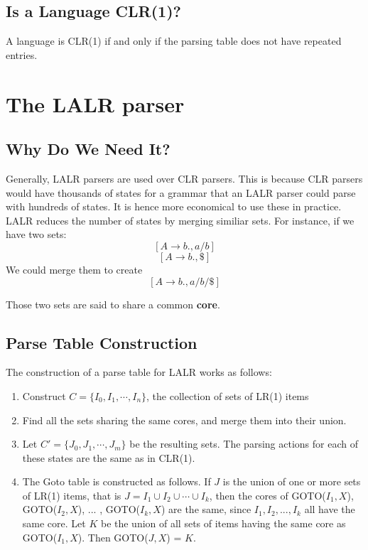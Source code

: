 \documentclass[12pt,letterpaper]{book}
\theoremstyle{definition}
\begin{document}
\subsection{Is a Language CLR(1)?}

A language is CLR(1) if and only if the parsing table does not have repeated entries.

\section{The LALR parser}

\subsection{Why Do We Need It?}

Generally, LALR parsers are used over CLR parsers. This is because CLR parsers would have thousands of states for a grammar that an LALR parser could parse with hundreds of states. It is hence more economical to use these in practice. LALR reduces the number of states by merging similiar sets. For instance, if we have two sets:
\[[A \rightarrow b ., a/b]\]
\[[A \rightarrow b ., \$]\]
We could merge them to create
\[[A \rightarrow b . , a/b/\$]\]

Those two sets are said to share a common \textbf{core}.

\subsection{Parse Table Construction}

The construction of a parse table for LALR works as follows:

\begin{enumerate}
  \item Construct $C = \{I_0,I_1,\cdots,I_n\}$, the collection of sets of LR(1) items
  \item Find all the sets sharing the same cores, and merge them into their union.
  \item Let $C' = \{J_0,J_1,\cdots,J_m\}$ be the resulting sets. The parsing actions for each of these states are the same as in CLR(1).
  \item The Goto table is constructed as follows. If $J$ is the union of one or more sets of LR(1) items, that is $J = I_1 \cup I_2 \cup \cdots \cup I_k$, then the cores of GOTO($I_1,X$), GOTO($I_2,X$), ... , GOTO($I_k,X$) are the same, since $I_1,I_2,...,I_k$ all have the same core. Let $K$ be the union of all sets of items having the same core as GOTO($I_1,X$). Then GOTO($J,X$) = $K$.
\end{enumerate}
\end{document}
